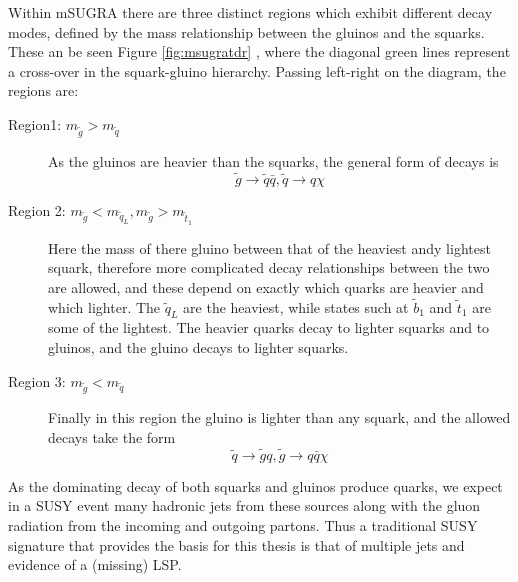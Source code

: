 Within mSUGRA there are three distinct regions which exhibit different decay modes, defined by the mass relationship between the gluinos and the squarks. These an be seen Figure \ref{fig:msugratdr} , where the diagonal green lines represent a cross-over in the squark-gluino hierarchy. Passing left-right on the diagram, the regions are:

\begin{description}
\item[Region1: $m_{\tilde{g}} > m_{\tilde{q}}$]{As the gluinos are heavier than the squarks, the general form of decays is
\begin{equation}
\tilde{g} \rightarrow \tilde{q} \bar{q} , \tilde{q} \rightarrow q \chi
\end{equation}
}
\item[Region 2: $m_{\tilde{g}}< m_{\tilde{q}_{L}}, m_{\tilde{g}}> m_{\tilde{t}_{1}} $]{Here the mass of there gluino between that of the heaviest andy lightest squark, therefore more complicated decay relationships between the two are allowed, and these depend on exactly which quarks are heavier and which lighter. The $\tilde{q}_{L}$ are the heaviest, while states such at $\tilde{b}_{1}$ and $\tilde{t}_{1}$ are some of the lightest. The heavier quarks decay to lighter squarks and to gluinos, and the gluino decays to lighter squarks. }
\item[Region 3: $m_{\tilde{g}} < m_{\tilde{q}}$]{Finally in this region the gluino is lighter than any squark, and the allowed decays take the form
\begin{equation}
\tilde{q} \rightarrow \tilde{g}q , \tilde{g} \rightarrow q\bar{q} \chi
\end{equation}
}
\end{description}

As the dominating decay of both squarks and gluinos produce quarks, we expect in a SUSY event many hadronic jets from these sources along with the gluon radiation from the incoming and outgoing partons. Thus a traditional SUSY signature that provides the basis for this thesis is that of multiple jets and evidence of a (missing) LSP. 



